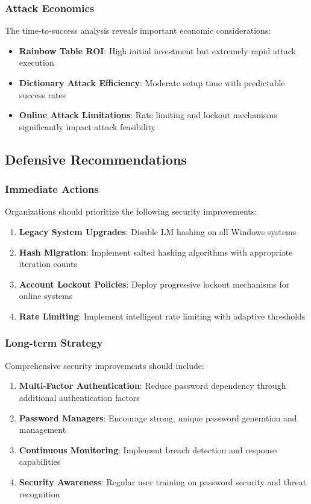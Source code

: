 {\subsubsection{Attack Economics}

The time-to-success analysis reveals important economic considerations:

\begin{itemize}
    \item \textbf{Rainbow Table ROI}: High initial investment but extremely rapid attack execution
    \item \textbf{Dictionary Attack Efficiency}: Moderate setup time with predictable success rates
    \item \textbf{Online Attack Limitations}: Rate limiting and lockout mechanisms significantly impact attack feasibility
\end{itemize}

\subsection{Defensive Recommendations}

\subsubsection{Immediate Actions}

Organizations should prioritize the following security improvements:

\begin{enumerate}
    \item \textbf{Legacy System Upgrades}: Disable LM hashing on all Windows systems
    \item \textbf{Hash Migration}: Implement salted hashing algorithms with appropriate iteration counts
    \item \textbf{Account Lockout Policies}: Deploy progressive lockout mechanisms for online systems
    \item \textbf{Rate Limiting}: Implement intelligent rate limiting with adaptive thresholds
\end{enumerate}

\subsubsection{Long-term Strategy}

Comprehensive security improvements should include:

\begin{enumerate}
    \item \textbf{Multi-Factor Authentication}: Reduce password dependency through additional authentication factors
    \item \textbf{Password Managers}: Encourage strong, unique password generation and management
    \item \textbf{Continuous Monitoring}: Implement breach detection and response capabilities
    \item \textbf{Security Awareness}: Regular user training on password security and threat recognition
\end{enumerate}

}

